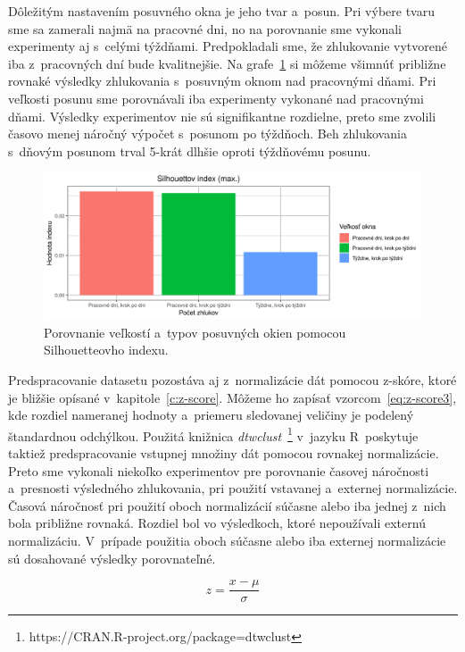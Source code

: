 \documentclass[a4paper,twoside,slovak,12pt,appendix]{article}
\begin{document}
\noindent
Dôležitým nastavením posuvného okna je jeho tvar a~posun. Pri výbere tvaru sme
sa zamerali najmä na pracovné dni, no na porovnanie sme vykonali experimenty aj
s~celými týždňami. Predpokladali sme, že zhlukovanie vytvorené iba z~pracovných
dní bude kvalitnejšie. Na grafe~\ref{fig:cvi-window-sil} si môžeme všimnúť
približne rovnaké výsledky zhlukovania s~posuvným oknom nad pracovnými dňami.
Pri veľkosti posunu sme porovnávali iba experimenty vykonané nad pracovnými
dňami. Výsledky experimentov nie sú signifikantne rozdielne, preto sme zvolili
časovo menej náročný výpočet s~posunom po týždňoch. Beh zhlukovania s~dňovým
posunom trval 5-krát dlhšie oproti týždňovému posunu.

\begin{figure}[H]
  \centering
  \includegraphics[width=\textwidth]{cvi/window_comparison/201904291100-Sil-window_comparison.png}
  \caption{Porovnanie veľkostí a~typov posuvných okien pomocou Silhouetteovho indexu.}
	\label{fig:cvi-window-sil}
\end{figure}

\noindent
Predspracovanie datasetu pozostáva aj z~normalizácie dát pomocou z-skóre, ktoré
je bližšie opísané v~kapitole~\ref{c:z-score}. Môžeme ho zapísať
vzorcom~\ref{eq:z-score3}, kde rozdiel nameranej hodnoty a~priemeru sledovanej
veličiny je podelený štandardnou odchýlkou. Použitá knižnica
\textit{dtwclust}~\footnote{https://CRAN.R-project.org/package=dtwclust}
v~jazyku R~poskytuje taktiež predspracovanie vstupnej množiny dát pomocou
rovnakej normalizácie. Preto sme vykonali niekoľko experimentov pre porovnanie
časovej náročnosti a~presnosti výsledného zhlukovania, pri použití vstavanej
a~externej normalizácie. Časová náročnosť pri použití oboch normalizácií súčasne
alebo iba jednej z~nich bola približne rovnaká. Rozdiel bol vo výsledkoch, ktoré
nepoužívali externú normalizáciu. V~prípade použitia oboch súčasne alebo iba
externej normalizácie sú dosahované výsledky porovnateľné.

\begin{equation}
	\label{eq:z-score3}
  z = \frac{x-\mu}{\sigma}
\end{equation}
\end{document}
